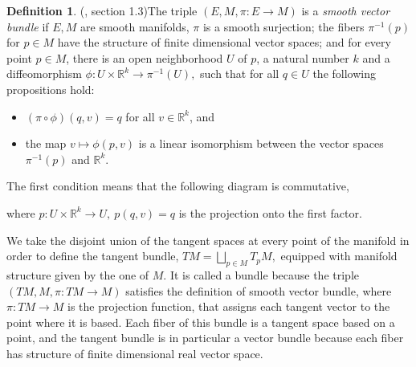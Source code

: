 \documentclass[12pt, letterpaper, reqno]{amsart}
\theoremstyle{definition}
\newtheorem{df}{Definition}
\theoremstyle{plain}
\theoremstyle{remark}
\begin{document}
\begin{df}(\cite{luke2013vector}, section 1.3)\label{def:smooth_vector_bundle}
	The triple $ (E, M, \pi: E \rightarrow {M}) $ is a \textit{smooth vector bundle} if $ E,M $ are smooth manifolds, $ \pi $ is a smooth surjection; the fibers $ \pi^{-1}(p) $ for $ p\in M $  have the structure of finite dimensional vector spaces; and for every point $ p\in M $, there is an open neighborhood $ U $ of $ p $, a natural number $ k $ and a diffeomorphism $ \phi: U\times \mathbb{R}^k \rightarrow  \pi^{-1}(U),$ such that for all $ q\in U $ the following propositions hold:  

	\begin{itemize}
		\item $ (\pi\circ \phi)(q,v)=q $ for all $ v\in \mathbb{R}^k $, and  
		\item the map $ v \mapsto \phi(p,v) $ is a linear isomorphism between the vector spaces $\pi^{-1}(p) $ and $ \mathbb{R}^k. $     
	\end{itemize}
	The first condition means that the following diagram is commutative,	
	\begin{center}
	\end{center}
	where $ p:U\times \mathbb{R}^k \rightarrow U, \ p(q,v)=q$ is the projection onto the first factor.
\end{df}
We take the disjoint union of the tangent spaces at every point of the manifold in order to define the tangent bundle,
$ TM = \bigsqcup_{p\in M} T_pM, $ 
equipped with manifold structure given by the one of $ M. $ It is called a bundle because the triple $ (TM, M,\pi:TM \rightarrow {M}) $ satisfies the definition of smooth vector bundle, where $ \pi:TM \rightarrow {M} $  is the projection function, that assigns each tangent vector to the point where it is based. Each fiber of this bundle is a tangent space based on a point, and the tangent bundle is in particular a vector bundle because each fiber has structure of finite dimensional real vector space.
\end{document}
